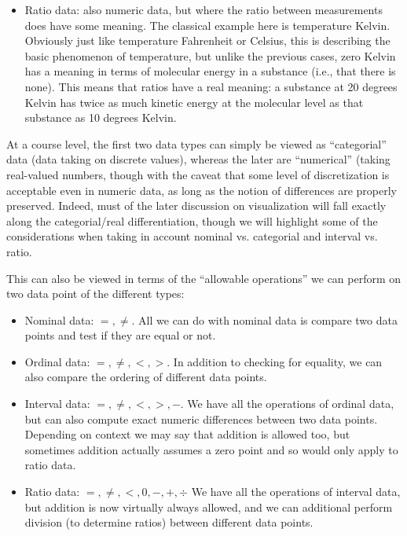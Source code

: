 \documentclass[openany]{book}
\begin{document}
\begin{itemize}
    \item Ratio data: also numeric data, but where the ratio between measurements does have some meaning. The classical example here is temperature Kelvin. Obviously just like temperature Fahrenheit or Celsius, this is describing the basic phenomenon of temperature, but unlike the previous cases, zero Kelvin has a meaning in terms of molecular energy in a substance (i.e., that there is none). This means that ratios have a real meaning: a substance at 20 degrees Kelvin has twice as much kinetic energy at the molecular level as that substance as 10 degrees Kelvin. 


\end{itemize}

 At a course level, the first two data types can simply be viewed as “categorial” data (data taking on discrete values), whereas the later are “numerical” (taking real-valued numbers, though with the caveat that some level of discretization is acceptable even in numeric data, as long as the notion of differences are properly preserved. Indeed, must of the later discussion on visualization will fall exactly along the categorial/real differentiation, though we will highlight some of the considerations when taking in account nominal vs. categorial and interval vs. ratio.



This can also be viewed in terms of the “allowable operations” we can perform on two data point of the different types:

\begin{itemize}
    \item Nominal data: $=, \neq$. All we can do with nominal data is compare two data points and test if they are equal or not.
    \item Ordinal data: $=, \neq,<,>$. In addition to checking for equality, we can also compare the ordering of different data points.
    \item  Interval data: $=, \neq,<,>,-$. We have all the operations of ordinal data, but can also compute exact numeric differences between two data points. Depending on context we may say that addition is allowed too, but sometimes addition actually assumes a zero point and so would only apply to ratio data.
    \item Ratio data: $=, \neq,<, 0,-,+, \div$ We have all the operations of interval data, but addition is now virtually always allowed, and we can additional perform division (to determine ratios) between different data points.

\end{itemize}
\end{document}
